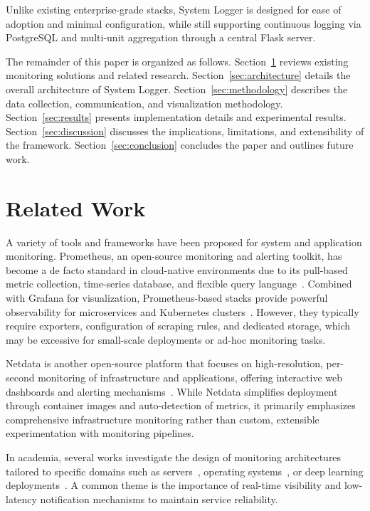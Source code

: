 \documentclass[conference]{IEEEtran}
\begin{document}
Unlike existing enterprise-grade stacks, System Logger is designed for ease of adoption and minimal configuration, while still supporting continuous logging via PostgreSQL and multi-unit aggregation through a central Flask server.

The remainder of this paper is organized as follows. Section~\ref{sec:related} reviews existing monitoring solutions and related research. Section~\ref{sec:architecture} details the overall architecture of System Logger. Section~\ref{sec:methodology} describes the data collection, communication, and visualization methodology. Section~\ref{sec:results} presents implementation details and experimental results. Section~\ref{sec:discussion} discusses the implications, limitations, and extensibility of the framework. Section~\ref{sec:conclusion} concludes the paper and outlines future work.

\section{Related Work}
\label{sec:related}

A variety of tools and frameworks have been proposed for system and application monitoring. Prometheus, an open-source monitoring and alerting toolkit, has become a de facto standard in cloud-native environments due to its pull-based metric collection, time-series database, and flexible query language~\cite{irjetPromGraf,janiUnified}. Combined with Grafana for visualization, Prometheus-based stacks provide powerful observability for microservices and Kubernetes clusters~\cite{observabilityOS,belloAWS}. However, they typically require exporters, configuration of scraping rules, and dedicated storage, which may be excessive for small-scale deployments or ad-hoc monitoring tasks.

Netdata is another open-source platform that focuses on high-resolution, per-second monitoring of infrastructure and applications, offering interactive web dashboards and alerting mechanisms~\cite{netdataSite,tecmintNetdata,digitaloceanNetdata}. While Netdata simplifies deployment through container images and auto-detection of metrics, it primarily emphasizes comprehensive infrastructure monitoring rather than custom, extensible experimentation with monitoring pipelines.

In academia, several works investigate the design of monitoring architectures tailored to specific domains such as servers~\cite{irjetPromGraf}, operating systems~\cite{observabilityOS}, or deep learning deployments~\cite{ijisaeDLMonitor}. A common theme is the importance of real-time visibility and low-latency notification mechanisms to maintain service reliability.
\end{document}
